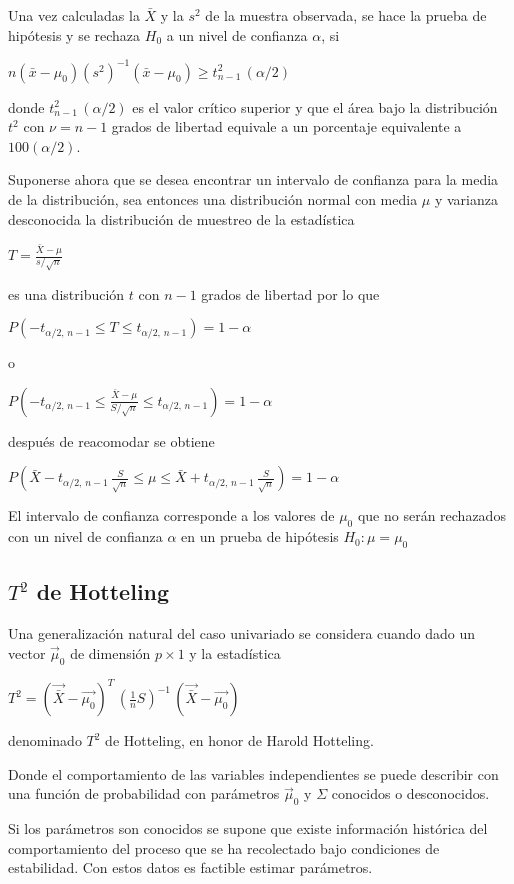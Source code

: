 \documentclass[spanish]{report}
\begin{document}
Una vez calculadas la $\bar{X}$ y la $s^2$ de la muestra observada, se hace la prueba de hipótesis y se rechaza $H_0$ a un nivel de confianza $\alpha$, si

$n(\bar{x}-\mu_0)(s^2)^{-1}(\bar{x}-\mu_0) \geq t^2_{n-1}\,(\alpha/2)$

donde $t^2_{n-1}\,(\alpha/2)$ es el valor crítico superior y que el área bajo la distribución $t^2$ con $\nu=n-1$ grados de libertad equivale a un porcentaje equivalente a $100(\alpha/2)$.

Suponerse ahora que se desea encontrar un intervalo de confianza para la media de la distribución, sea entonces una distribución normal con media $\mu$ y varianza desconocida la distribución de muestreo de la estadística

$T=\frac{\bar{X}-\mu}{s/\sqrt{n}}$   

es una distribución $t$ con $n-1$ grados de libertad por lo que 

$P(-t_{\alpha/2,\,n-1} \leq T \leq t_{\alpha/2,\,n-1})=1-\alpha$

o

$P(-t_{\alpha/2,\,n-1} \leq \frac{\bar{X}-\mu}{S/\sqrt{n}} \leq t_{\alpha/2,\,n-1})=1-\alpha$

después de reacomodar se obtiene

$P(\bar{X}-t_{\alpha/2,\,n-1}\,\frac{S}{\sqrt{n}} \leq \mu \leq \bar{X}+t_{\alpha/2,\,n-1}\,\frac{S}{\sqrt{n}})= 1-\alpha$

El intervalo de confianza corresponde a los valores de $\mu_0$ que no serán rechazados con un nivel de confianza $\alpha$ en un prueba de hipótesis $H_0:\mu=\mu_0$

\subsection{$T^2$ de Hotteling}

Una generalización natural del caso univariado se considera cuando dado un vector $\vec{\mu}_0$ de dimensión $p\times 1$ y la estadística

$T^2 =(\vec{\bar{X}}-\vec{\mu_0})^T\,(\frac{1}{n}S)^{-1}\,(\vec{\bar{X}}-\vec{\mu_0})$

denominado $T^2$ de Hotteling, en honor de Harold Hotteling. 

Donde el comportamiento de las variables independientes se puede describir con una función de probabilidad con parámetros $\vec{\mu}_0$ y $\Sigma$ conocidos o desconocidos.

Si los parámetros son conocidos se supone que existe información histórica del comportamiento del proceso que se ha recolectado bajo condiciones de estabilidad. Con estos datos es factible estimar parámetros.
\end{document}
